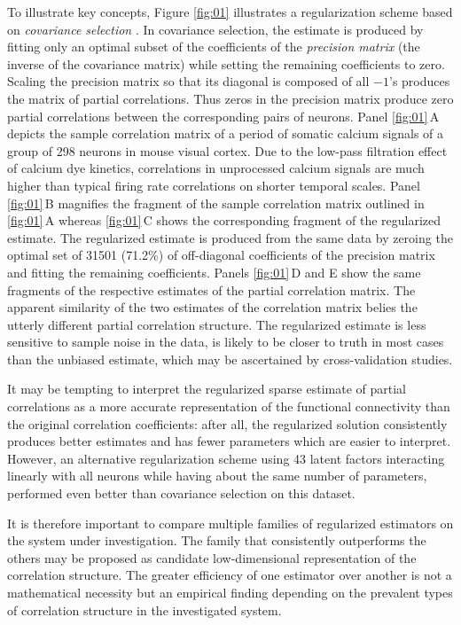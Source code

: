 \documentclass[10pt]{article}
\begin{document}
To illustrate key concepts, Figure \ref{fig:01} illustrates a regularization scheme based on \emph{covariance selection} \cite{Dempster:1972}. In covariance selection, the estimate is produced by fitting only an optimal subset of the coefficients of the \emph{precision matrix} (the inverse of the covariance matrix) while setting the remaining coefficients to zero. Scaling the precision matrix so that its diagonal is composed of all $-1$'s produces the matrix of partial correlations. Thus zeros in the precision matrix produce zero partial correlations between the corresponding pairs of neurons.  Panel \ref{fig:01}\,A depicts the sample correlation matrix of a period of somatic calcium signals of a group of 298 neurons in mouse visual cortex.  Due to the low-pass filtration effect of calcium dye kinetics, correlations in unprocessed calcium signals are much higher than typical firing rate correlations on shorter temporal scales. Panel \ref{fig:01}\,B magnifies the fragment of the sample correlation matrix outlined in \ref{fig:01}\,A whereas \ref{fig:01}\,C shows the corresponding fragment of the regularized estimate. The regularized estimate is produced from the same data by zeroing the optimal set of 31501 (71.2\%) of off-diagonal coefficients of the precision matrix and fitting the remaining coefficients. Panels \ref{fig:01}\,D and E show the same fragments of the respective estimates of the partial correlation matrix. The apparent similarity of the two estimates of the correlation matrix belies the utterly different partial correlation structure. The regularized estimate is less sensitive to sample noise in the data, is likely to be closer to truth in most cases than the unbiased estimate, which may be ascertained by cross-validation studies.

It may be tempting to interpret the regularized sparse estimate of partial correlations as a more accurate representation of the functional connectivity than the original correlation coefficients: after all, the regularized solution consistently produces better estimates and has fewer parameters which are easier to interpret. However, an alternative regularization scheme using 43 latent factors interacting linearly with all neurons while having about the same number of parameters, performed even better than covariance selection on this dataset.

It is therefore important to compare multiple families of regularized estimators on the system under investigation. The family that consistently outperforms the others may be proposed as candidate low-dimensional representation of the correlation structure. The greater efficiency of one estimator over another is not a mathematical necessity but an empirical finding depending on the prevalent types of correlation structure in the investigated system.
\end{document}
